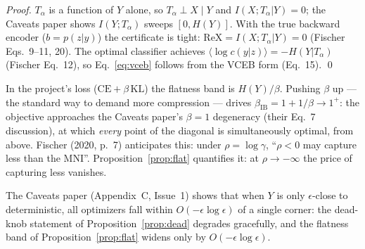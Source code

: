 \begin{proof}
$T_\alpha$ is a function of $Y$ alone, so $T_\alpha \perp X \mid Y$ and
$I(X;T_\alpha|Y) = 0$; the Caveats paper shows $I(Y;T_\alpha)$ sweeps $[0, H(Y)]$.
With the true backward encoder ($b = p(z|y)$) the certificate is tight:
$\mathrm{ReX} = I(X;T_\alpha|Y) = 0$ (Fischer Eqs.~9--11, 20). The optimal classifier
achieves $\langle \log c(y|z)\rangle = -H(Y|T_\alpha)$ (Fischer Eq.~12), so
Eq.~\eqref{eq:vceb} follows from the VCEB form (Eq.~15). \hfill\qed
\end{proof}

\begin{remark}\label{rem:convention}
In the project's loss ($\mathrm{CE} + \beta\,\mathrm{KL}$) the flatness band is
$H(Y)/\beta$. Pushing $\beta$ up --- the standard way to demand more compression --- drives
$\beta_{\mathrm{IB}} = 1 + 1/\beta \to 1^+$: the objective approaches the Caveats paper's
$\beta = 1$ degeneracy (their Eq.~7 discussion), at which \emph{every} point of the
diagonal is simultaneously optimal, from above. Fischer (2020, p.~7) anticipates this:
under $\rho = \log\gamma$, ``$\rho < 0$ may capture less than the MNI''.
Proposition~\ref{prop:flat} quantifies it: at $\rho \to -\infty$ the price of capturing
less vanishes.
\end{remark}

\begin{remark}\label{rem:approx}
The Caveats paper (Appendix~C, Issue~1) shows that when $Y$ is only $\epsilon$-close to
deterministic, all optimizers fall within $O(-\epsilon\log\epsilon)$ of a single corner:
the dead-knob statement of Proposition~\ref{prop:dead} degrades gracefully, and the
flatness band of Proposition~\ref{prop:flat} widens only by $O(-\epsilon\log\epsilon)$.
\end{remark}

